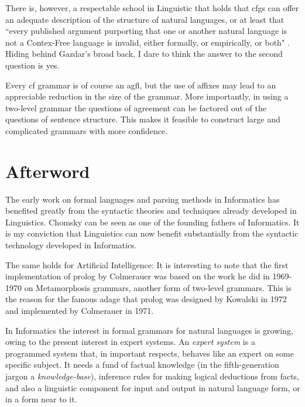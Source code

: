There is, however, a respectable school in Linguistic that holds that
{\sc cfg}s can offer an adequate description of the structure of
natural languages,
or at least that ``every published argument purporting that one or another
natural language is not a Contex-Free language is invalid, either formally,
or empirically, or both" \cite{l30}. Hiding behind Gazdar's broad back, I
dare to think the answer to the second question is yes.

Every {\sc cf} grammar is of course an {\sc agfl}, but the use of affixes may lead
to an appreciable reduction in the size of the grammar.
More importantly, in using a two-level grammar the questions
of agreement can be factored out of the questions of sentence structure.
This makes it feasible to construct large and complicated grammars with
more confidence.
\section{Afterword}
The early work on formal languages and parsing methods in
Informatics has benefited greatly from the syntactic theories and
techniques already developed in Linguistics. Chomsky can be seen
as one of the founding fathers of Informatics. It is my conviction
that Linguistics can now benefit substantially from the syntactic
technology developed in Informatics.

The same holds for Artificial Intelligence:
It is interesting to note that the first implementation of {\sc prolog}
by Colmerauer was based on the work he did in 1969-1970 on
Metamorphosis grammars, another form of two-level grammars.
This is the reason for the famous adage that {\sc prolog} was designed
by Kowalski in 1972 and implemented by Colmerauer in 1971.

In Informatics the interest in formal grammars for natural
languages is growing, owing to the present interest in expert
systems. An {\em expert system} is a programmed system that, in
important respects, behaves like an expert on some specific
subject.  It needs a fund of factual knowledge (in the fifth-generation
jargon a {\em knowledge-base}), inference rules for making
logical deductions from facts, and also a linguistic component for
input and output in natural language form, or in a form near to it.


